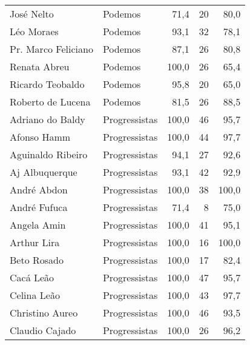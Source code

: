 \begin{longtable}{llrrr}
                          José Nelto &        Podemos &      71,4 &           20 &       80,0 \\
                          Léo Moraes &        Podemos &      93,1 &           32 &       78,1 \\
                 Pr. Marco Feliciano &        Podemos &      87,1 &           26 &       80,8 \\
                        Renata Abreu &        Podemos &     100,0 &           26 &       65,4 \\
                    Ricardo Teobaldo &        Podemos &      95,8 &           20 &       65,0 \\
                   Roberto de Lucena &        Podemos &      81,5 &           26 &       88,5 \\
                    Adriano do Baldy &  Progressistas &     100,0 &           46 &       95,7 \\
                         Afonso Hamm &  Progressistas &     100,0 &           44 &       97,7 \\
                   Aguinaldo Ribeiro &  Progressistas &      94,1 &           27 &       92,6 \\
                      Aj Albuquerque &  Progressistas &      93,1 &           42 &       92,9 \\
                         André Abdon &  Progressistas &     100,0 &           38 &      100,0 \\
                        André Fufuca &  Progressistas &      71,4 &            8 &       75,0 \\
                         Angela Amin &  Progressistas &     100,0 &           41 &       95,1 \\
                         Arthur Lira &  Progressistas &     100,0 &           16 &      100,0 \\
                         Beto Rosado &  Progressistas &     100,0 &           17 &       82,4 \\
                           Cacá Leão &  Progressistas &     100,0 &           47 &       95,7 \\
                         Celina Leão &  Progressistas &     100,0 &           43 &       97,7 \\
                     Christino Aureo &  Progressistas &     100,0 &           46 &       93,5 \\
                      Claudio Cajado &  Progressistas &     100,0 &           26 &       96,2 \\

\end{longtable}
